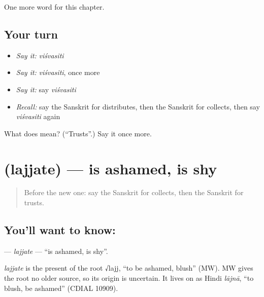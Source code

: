 \begin{grammarlens}[title={What you've built}]
One more word for this chapter.
\end{grammarlens}

\subsection*{Your turn}
\begin{itemize}
\raggedright
  \item \emph{Say it:} \emph{viśvasiti}
  \item \emph{Say it:} \emph{viśvasiti}, once more
  \item \emph{Say it:} say \emph{viśvasiti}
  \item \emph{Recall:} say the Sanskrit for distributes, then the Sanskrit for collects, then say \emph{viśvasiti} again
\end{itemize}

\begin{tcolorbox}[breakable,colback=teal!4,colframe=teal!35!black,title={Before you move on}]
What does  mean? (\textquotedblleft{}Trusts\textquotedblright{}.) Say it once more.
\end{tcolorbox}
\section[\texorpdfstring{\sk{लज्जते} (lajjate)}{लज्जते (lajjate)}]{ (lajjate) — is ashamed, is shy}

\label{lesson:SA-C177-lajjate}



\begin{quote}
Before the new one: say the Sanskrit for collects, then the Sanskrit for trusts.
\end{quote}

\subsection*{You'll want to know: }
\textbf{} — \emph{lajjate} — \textquotedblleft{}is ashamed, is shy\textquotedblright{}.

\begin{cousinweb}
\emph{lajjate} is the present of the root √lajj, \textquotedblleft{}to be ashamed, blush\textquotedblright{} (MW). MW gives the root no older source, so its origin is uncertain. It lives on as Hindi \emph{lājnā}, \textquotedblleft{}to blush, be ashamed\textquotedblright{} (CDIAL 10909).
\end{cousinweb}

